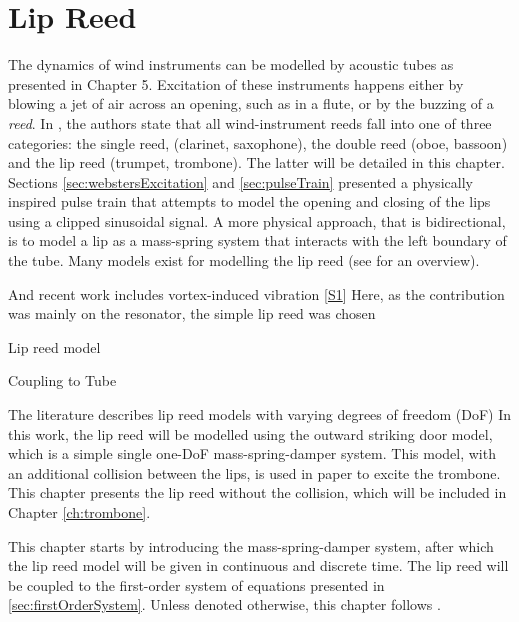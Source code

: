 \chapter{Lip Reed}\label{ch:lipreed}
The dynamics of wind instruments can be modelled by acoustic tubes as presented in Chapter 5. Excitation of these instruments happens either by blowing a jet of air across an opening, such as in a flute, or by the buzzing of a \textit{reed}. In \cite{Fletcher1998}, the authors state that all wind-instrument reeds fall into one of three categories: the single reed, (clarinet, saxophone), the double reed (oboe, bassoon) and the lip reed (trumpet, trombone). The latter will be detailed in this chapter.
Sections \ref{sec:webstersExcitation} and \ref{sec:pulseTrain} presented a physically inspired pulse train that attempts to model the opening and closing of the lips using a clipped sinusoidal signal. A more physical approach, that is bidirectional, is to model a lip as a mass-spring system that interacts with the left boundary of the tube. Many models exist for modelling the lip reed (see \cite{Fletcher1998,Harrison2018} for an overview). 

And recent work includes vortex-induced vibration [\hyperref[ch:listOfPublications]{S1}]  Here, as the contribution was mainly on the resonator, the simple lip reed was chosen



Lip reed model



Coupling to Tube




The literature describes lip reed models with varying degrees of freedom (DoF)
In this work, the lip reed will be modelled using the outward striking door model, which is a simple single one-DoF mass-spring-damper system. This model, with an additional collision between the lips, is used in paper \citeP[H] to excite the trombone. This chapter presents the lip reed without the collision, which will be included in Chapter \ref{ch:trombone}.

This chapter starts by introducing the mass-spring-damper system, after which the lip reed model will be given in continuous and discrete time. The lip reed will be coupled to the first-order system of equations presented in \ref{sec:firstOrderSystem}. Unless denoted otherwise, this chapter follows \cite{Harrison2018}. 

